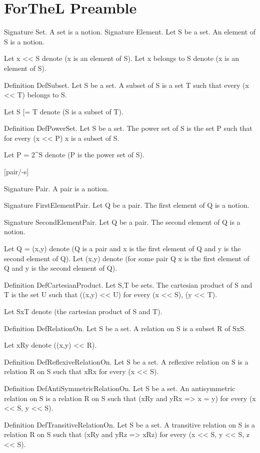 \section*{ForTheL Preamble}

\begin{forthelfull}
[set/-s] [element/-s] [belong/-s]

Signature Set. A set is a notion.
Signature Element. 
    Let S be a set.
    An element of S is a notion.

Let x << S denote (x is an element of S).
Let x belongs to S denote (x is an element of S).

Definition DefSubset. 
    Let S be a set.
    A subset of S is a set T such that every (x << T) belongs to S.

Let S [= T denote (S is a subset of T).

Definition DefPowerSet. 
    Let S be a set.
    The power set of S is the set P such that
    for every (x << P) x is a subset of S.

Let P = 2^S denote (P is the power set of S).

[pair/-s]

Signature Pair. A pair is a notion.

Signature FirstElementPair.
    Let Q be a pair.
    The first element of Q is a notion.

Signature SecondElementPair.
    Let Q be a pair.
    The second element of Q is a notion.

Let Q = (x,y) denote (Q is a pair and x is the first element of Q and y is the second element of Q).
Let (x,y) denote (for some pair Q x is the first element of Q and y is the second element of Q).

Definition DefCartesianProduct. 
    Let S,T be sets.
    The cartesian product of S and T is the set U such that
    ((x,y) << U) for every (x << S), (y << T).

Let SxT denote (the cartesian product of S and T).

Definition DefRelationOn. 
    Let S be a set.
    A relation on S is a subset R of SxS.

Let xRy denote ((x,y) << R).    

Definition DefReflexiveRelationOn. 
    Let S be a set.
    A reflexive relation on S is a relation R on S such that
    xRx for every (x << S).

Definition DefAntiSymmetricRelationOn. 
    Let S be a set.
    An antisymmetric relation on S is a relation R on S such that
    (xRy and yRx => x = y) for every (x << S, y << S).

Definition DefTransitiveRelationOn.
    Let S be a set.
    A transitive relation on S is a relation R on S such that
    (xRy and yRz => xRz) for every (x << S, y << S, z << S).
\end{forthelfull}
